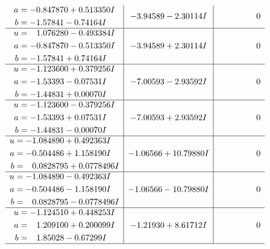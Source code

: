 \documentclass[1p]{elsarticle_modified}
\theoremstyle{definition}
\begin{document}
$$\begin{array}{c|c|c}
\begin{aligned}
a &= -0.847870 + 0.513350 I \\
b &= -1.57841 - 0.74164 I\end{aligned}
 & -3.94589 - 2.30114 I & \phantom{-0.000000 } 0 \\ \hline\begin{aligned}
u &= \phantom{-}1.076280 - 0.493384 I \\
a &= -0.847870 - 0.513350 I \\
b &= -1.57841 + 0.74164 I\end{aligned}
 & -3.94589 + 2.30114 I & \phantom{-0.000000 } 0 \\ \hline\begin{aligned}
u &= -1.123600 + 0.379256 I \\
a &= -1.53393 - 0.07531 I \\
b &= -1.44831 + 0.00070 I\end{aligned}
 & -7.00593 - 2.93592 I & \phantom{-0.000000 } 0 \\ \hline\begin{aligned}
u &= -1.123600 - 0.379256 I \\
a &= -1.53393 + 0.07531 I \\
b &= -1.44831 - 0.00070 I\end{aligned}
 & -7.00593 + 2.93592 I & \phantom{-0.000000 } 0 \\ \hline\begin{aligned}
u &= -1.084890 + 0.492363 I \\
a &= -0.504486 + 1.158190 I \\
b &= \phantom{-}0.0828795 + 0.0778496 I\end{aligned}
 & -1.06566 + 10.79880 I & \phantom{-0.000000 } 0 \\ \hline\begin{aligned}
u &= -1.084890 - 0.492363 I \\
a &= -0.504486 - 1.158190 I \\
b &= \phantom{-}0.0828795 - 0.0778496 I\end{aligned}
 & -1.06566 - 10.79880 I & \phantom{-0.000000 } 0 \\ \hline\begin{aligned}
u &= -1.124510 + 0.448253 I \\
a &= \phantom{-}1.209100 + 0.200099 I \\
b &= \phantom{-}1.85028 - 0.67299 I\end{aligned}
 & -1.21930 + 8.61712 I & \phantom{-0.000000 } 0\\
 \hline 
 \end{array}$$\newpage$$\begin{array}{c|c|c}  

\end{array}$$
\end{document}
